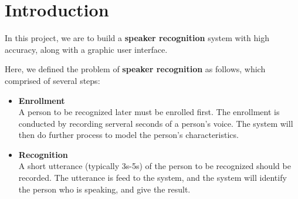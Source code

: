 \section{Introduction}
	In this project, we are to build a \textbf{speaker recognition} system with
	high accuracy, along with a graphic user interface.

	Here, we defined the problem of \textbf{speaker recognition} as follows,
	which comprised of several steps:
	\begin{itemize}
		\item \textbf{Enrollment} \\
			A person to be recognized later must be enrolled first. The enrollment
			is conducted by recording serveral seconds of a person's voice.
			The system will then do further process to model the person's characteristics.

		\item \textbf{Recognition} \\
			A short utterance (typically 3s-5s) of the person to be recognized should
			be recorded. The utterance is feed to the system, and the system will identify
			the person who is speaking, and give the result.

	\end{itemize}


